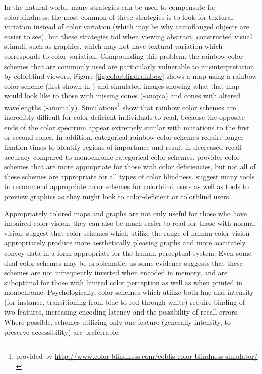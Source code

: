 \documentclass[11pt]{isuthesis}\usepackage[]{graphicx}\usepackage[]{color}
\begin{document}
In the natural world, many strategies can be used to compensate for colorblindness; the most common of these strategies is to look for textural variation instead of color variation (which may be why camoflauged objects are easier to see), but these strategies fail when viewing abstract, constructed visual stimuli, such as graphics, which may not have textural variation which corresponds to color variation. Compounding this problem, the rainbow color schemes that are commonly used are particularly vulnerable to misinterpretation by colorblind viewers. Figure \ref{fig:colorblindrainbow} shows a map using a rainbow color scheme (first shown in \citet{light2004end}) and simulated images showing what that map would look like to those with missing cones (-anopia) and cones with altered wavelengths (-anomaly). Simulations\footnote{provided by \url{http://www.color-blindness.com/coblis-color-blindness-simulator/}} show that rainbow color schemes are incredibly difficult for color-deficient individuals to read, because the opposite ends of the color spectrum appear extremely similar with mutations to the first or second cones. In addition, categorical rainbow color schemes require longer fixation times to identify regions of importance \citep{lewandowsky1993perception} and result in decreased recall accuracy compared to monochrome categorical color schemes. \citet{light2004end} provides color schemes that are more appropriate for those with color deficiencies, but not all of these schemes are appropriate for all types of color blindness. \citet{silva2011using} suggest many tools to recommend appropriate color schemes for colorblind users as well as tools to preview graphics as they might look to color-deficient or colorblind users. 

Appropriately colored maps and graphs are not only useful for those who have impaired color vision, they can also be much easier to read for those with normal vision. \citet{rainbowcolor} suggest that color schemes which utilize the range of human color vision appropriately produce more aesthetically pleasing graphs and more accurately convey data in a form appropriate for the human perceptual system. Even some dual-color schemes may be problematic, as some evidence \citep{lewandowsky1993perception} suggests that these schemes are not infrequently inverted when encoded in memory, and are suboptimal for those with limited color perception as well as when printed in monochrome. Psychologically, color schemes which utilize both hue and intensity (for instance, transitioning from blue to red through white) require binding of two features, increasing encoding latency and the possibility of recall errors. Where possible, schemes utilizing only one feature (generally intensity, to preserve accessibility) are preferrable. 
\end{document}

